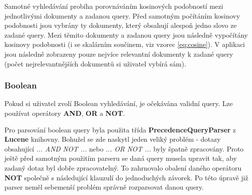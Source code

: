 \documentclass[12pt, a4paper]{article}
\begin{document}
Samotné vyhledávání probíha porovnáváním kosinových podobností mezi jednotlivými dokumenty a zadanou query. Před samotným počítáním kosinovy podobnosti jsou vybrány ty dokumenty, který obsahují alespoň jedno slovo ze zadané query. Mezi těmito dokumenty a zadanou query jsou následně vypočítány kosinovy podobnosti (i se skalárním součinem, viz vzorec \ref{eq:cosine}). V aplikaci jsou následně zobrazeny pouze nejvíce relevantní dokumenty k zadané query (počet nejrelevantnějších dokumentů si uživatel vybírá sám).
\subsubsection{Boolean}
Pokud si uživatel zvolí Boolean vyhledávání, je očekávána validní query. Lze používat operátory \textbf{AND}, \textbf{OR} a \textbf{NOT}.

Pro parsování boolean query byla použita třída \textbf{PrecedenceQueryParser} z \textbf{Lucene} knihovny. Bohužel se zde naskytl jeden veliký problém - dotazy obsahující \textit{... AND NOT ...} nebo \textit{... OR NOT ...} byly špatně zpracovány. Proto ještě před samotným použitím parseru se daná query musela upravit tak, aby zadaný dotaz byl dobře zpracovatelný. To zahrnovalo obalení daného operátoru \textbf{NOT} společně s následující klauzulí do jednoduchých závorek. Po této úpravě již parser neměl sebemenší problém správně rozparsovat danou query.
\end{document}
